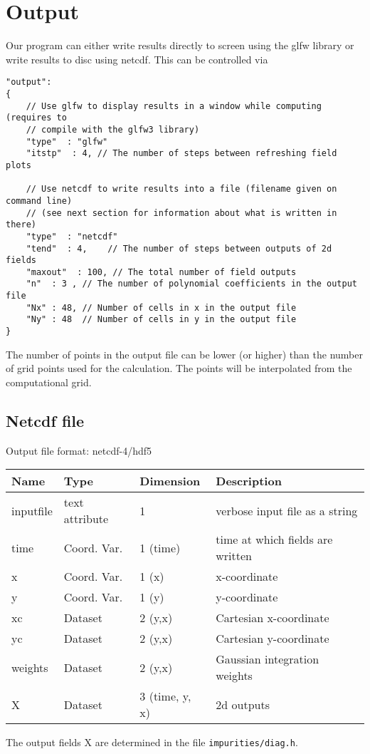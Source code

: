 \section{Output}
Our program can either write results directly to screen using the glfw library
or write results to disc using netcdf.
This can be controlled via
\begin{verbatim}
"output":
{
    // Use glfw to display results in a window while computing (requires to
    // compile with the glfw3 library)
    "type"  : "glfw"
    "itstp"  : 4, // The number of steps between refreshing field plots

    // Use netcdf to write results into a file (filename given on command line)
    // (see next section for information about what is written in there)
    "type"  : "netcdf"
    "tend"  : 4,    // The number of steps between outputs of 2d fields
    "maxout"  : 100, // The total number of field outputs
    "n"  : 3 , // The number of polynomial coefficients in the output file
    "Nx" : 48, // Number of cells in x in the output file
    "Ny" : 48  // Number of cells in y in the output file
}
\end{verbatim}
The number of points in the output file can be lower (or higher) than the number of
grid points used for the calculation. The points will be interpolated from the
computational grid.
\subsection{Netcdf file}
Output file format: netcdf-4/hdf5

\begin{longtable}{lll>{\RaggedRight}p{7cm}}
\toprule
\rowcolor{gray!50}\textbf{Name} &  \textbf{Type} & \textbf{Dimension} & \textbf{Description}  \\ \midrule
inputfile        & text attribute & 1 & verbose input file as a string \\
time             & Coord. Var. & 1 (time) & time at which fields are written \\
x                & Coord. Var. & 1 (x) & x-coordinate  \\
y                & Coord. Var. & 1 (y) & y-coordinate \\
xc               & Dataset & 2 (y,x) & Cartesian x-coordinate  \\
yc               & Dataset & 2 (y,x) & Cartesian y-coordinate \\
weights          & Dataset & 2 (y,x) & Gaussian integration weights \\
X                & Dataset & 3 (time, y, x) & 2d outputs \\
\bottomrule
\end{longtable}
The output fields X are determined in the file \texttt{impurities/diag.h}.




